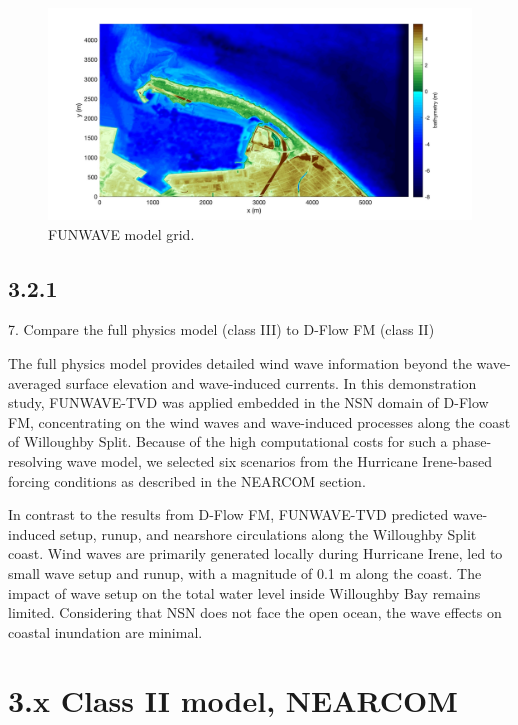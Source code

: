 \documentclass[11pt]{article}
\begin{document}
\begin{figure}[h!]
\centering
\includegraphics[width=\textwidth]{./figures/funwave_grid_sm.jpg}
\caption{FUNWAVE model grid.}
\label{funwave_grid}
\centering
\end{figure}

\subsection* {3.2.1}

7. Compare the full physics model (class III) to D-Flow FM (class II)

The full physics model provides detailed wind wave information beyond the wave-averaged surface elevation and wave-induced currents. In this demonstration study, FUNWAVE-TVD was applied embedded in the NSN domain of D-Flow FM, concentrating on the wind waves and wave-induced processes along the coast of Willoughby Split. Because of the high computational costs for such a phase-resolving wave model, we selected  six scenarios from the Hurricane Irene-based forcing conditions as described in the NEARCOM section. 

In contrast to the results from D-Flow FM, FUNWAVE-TVD predicted wave-induced setup, runup, and nearshore circulations along the Willoughby Split coast. Wind waves are primarily generated locally during Hurricane Irene, led to small wave setup and runup, with a magnitude of 0.1 m along the coast. The impact of wave setup on the total water level inside Willoughby Bay remains limited. Considering that NSN does not face the open ocean, the wave effects on coastal inundation are minimal.  

\section*{3.x Class II model, NEARCOM}
\end{document}
